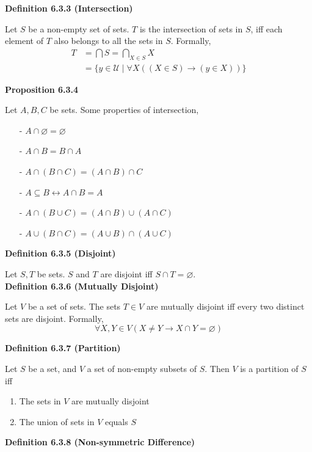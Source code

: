 \documentclass[a4paper]{article}
\newcommand{\subheading}[1]{{\scriptsize\textbf{#1}}}
\begin{document}
\begin{multicols*}{4}
\subheading{Definition 6.3.3 (Intersection)}

Let $S$ be a non-empty set of sets. $T$ is the intersection of sets in $S$, iff
each element of $T$ also belongs to all the sets in $S$. Formally,
\begin{align*}
  T &= \bigcap S = \bigcap_{X \in S} X \\
    &= \{y \in \mathcal{U}\;|\; \forall X ((X \in S) \rightarrow (y \in X)) \}
\end{align*}

\subheading{Proposition 6.3.4}

Let $A, B, C$ be sets. Some properties of intersection,

\begin{itemize}[leftmargin=*] \itemsep -0.3em
  \item[-] $A \cap \varnothing = \varnothing$
  \item[-] $A \cap B = B \cap A$
  \item[-] $A \cap (B \cap C) = (A \cap B) \cap C$
  \item[-] $A \subseteq B \longleftrightarrow A \cap B = A$
  \item[-] $A \cap (B \cup C) = (A \cap B) \cup (A \cap C)$
  \item[-] $A \cup (B \cap C) = (A \cup B) \cap (A \cup C)$
\end{itemize}

\subheading{Definition 6.3.5 (Disjoint)}

Let $S, T$ be sets. $S$ and $T$ are disjoint iff $S \cap T = \varnothing$.\\

\subheading{Definition 6.3.6 (Mutually Disjoint)}

Let $V$ be a set of sets. The sets $T \in V$ are mutually disjoint iff every two
distinct sets are disjoint. Formally,
$$\forall X, Y \in V (X \neq Y \rightarrow X \cap Y = \varnothing)$$

\subheading{Definition 6.3.7 (Partition)}

Let $S$ be a set, and $V$ a set of non-empty subsets of $S$. Then $V$ is a
partition of $S$ iff
\begin{enumerate} \itemsep -0.5em
  \item The sets in $V$ are mutually disjoint
  \item The union of sets in $V$ equals $S$
\end{enumerate}

\subheading{Definition 6.3.8 (Non-symmetric Difference)}


\end{multicols*}
\end{document}
